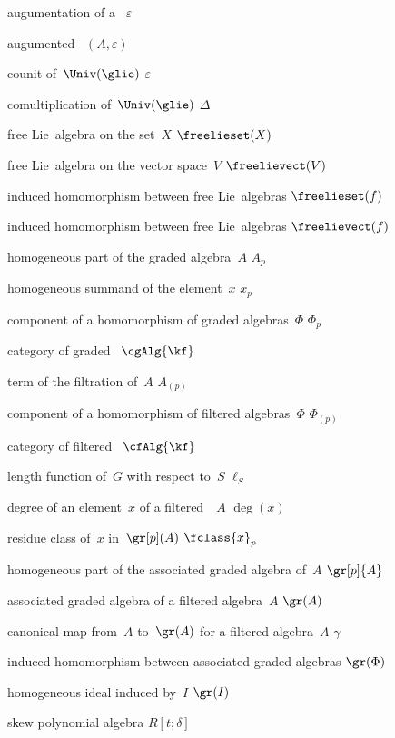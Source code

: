 {augumentation of a~\algebra{$\kf$}}
{$\varepsilon$}

{augumented~\algebra{$\kf$}}
{$(A, \varepsilon)$}

{counit of~$\Univ(\glie)$}
{$\varepsilon$}

{comultiplication of~$\Univ(\glie)$}
{$\Delta$}

{free Lie~algebra on the set~$X$}
{$\freelieset(X)$}

{free Lie~algebra on the vector space~$V$}
{$\freelievect(V)$}

{induced homomorphism between free Lie~algebras}
{$\freelieset(f)$}

{induced homomorphism between free Lie~algebras}
{$\freelievect(f)$}

{ homogeneous part of the graded algebra~$A$}
{$A_p$}

{ homogeneous summand of the element~$x$}
{$x_p$}

{ component of a homomorphism of graded algebras~$\Phi$}
{$\Phi_p$}

{category of graded~\algebras{$\kf$}}
{$\cgAlg{\kf}$}

{ term of the filtration of~$A$}
{$A_{(p)}$}

{ component of a homomorphism of filtered algebras~$\Phi$}
{$\Phi_{(p)}$}

{category of filtered~\algebras{$\kf$}}
{$\cfAlg{\kf}$}

{length function of~$G$ with respect to~$S$}
{$\ell_S$}

{degree of an element~$x$ of a filtered~\algebras{$\kf$}~$A$}
{$\deg(x)$}

{residue class of~$x$ in~$\gr[p](A)$}
{$\fclass{x}_p$}

{ homogeneous part of the associated graded algebra of~$A$}
{$\gr[p]{A}$}

{associated graded algebra of a filtered algebra~$A$}
{$\gr(A)$}

{canonical map from~$A$ to~$\gr(A)$ for a filtered algebra~$A$}
{$\gamma$}

{induced homomorphism between associated graded algebras}
{$\gr(\Phi)$}

{homogeneous ideal induced by~$I$}
{$\gr(I)$}

{skew polynomial algebra}
{$R[t; \delta]$}
